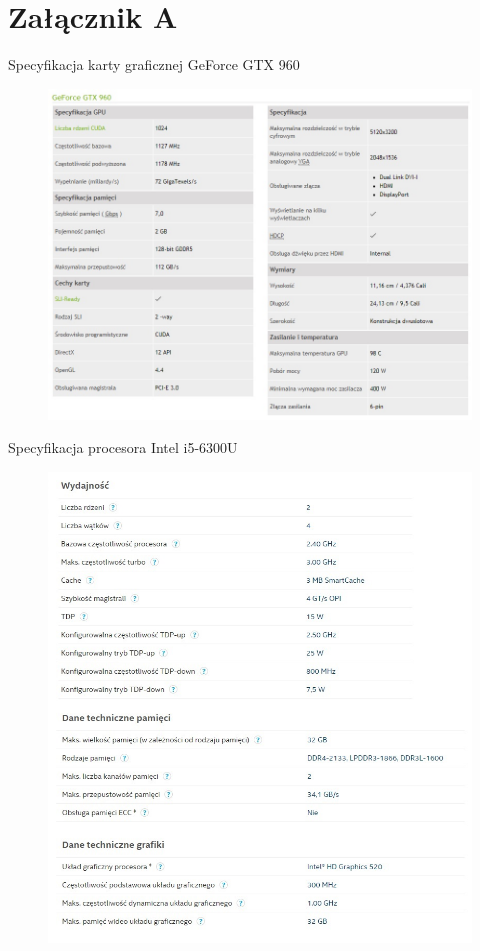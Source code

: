 \documentclass[document.tex]{subfiles}
\begin{document}
\chapter{Załącznik A}

\Large{Specyfikacja karty graficznej GeForce GTX 960}

\begin{figure}[h]
\includegraphics[scale=0.75]{imgs/gtx960_spec.jpg}
\caption*{}
\label{fig:results_pc_serial}
\end{figure}
\clearpage

\Large{Specyfikacja procesora Intel i5-6300U}

\begin{figure}[h]
\includegraphics[scale=0.75]{imgs/intel_i56300u520_spec.jpg}
\caption*{}
\label{fig:intel_i56300u}
\end{figure}
\end{document}
